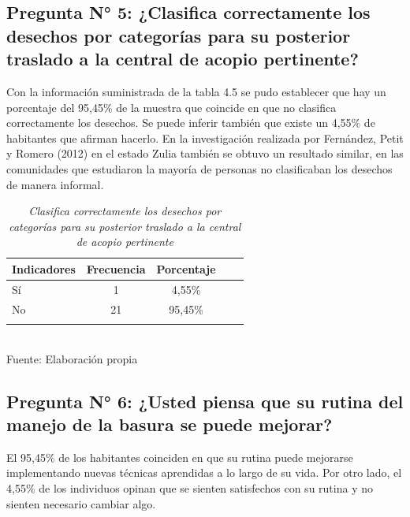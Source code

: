 {\setlength{\parskip}{0cm}
\subsection{Pregunta N° 5: ¿Clasifica correctamente los desechos por categorías para su posterior traslado a la central de acopio pertinente?}

Con la información suministrada de la tabla 4.5 se pudo establecer que hay un porcentaje del 95,45\% de la muestra que coincide en que no clasifica correctamente los desechos. Se puede inferir también que existe un 4,55\% de habitantes que afirman hacerlo. En la investigación realizada por Fernández, Petit y Romero (2012) en el estado Zulia también se obtuvo un resultado similar, en las comunidades que estudiaron la mayoría de personas no clasificaban los desechos de manera informal.

\newpage

\begin{table}[ht!]
    \centering
    \captionsetup{singlelinecheck=false, justification=raggedright, labelsep=newline}
    \caption{\textit{Clasifica correctamente los desechos por categorías para su posterior traslado a la central de acopio pertinente}}
    \begin{tabular}{lcccc}
        \toprule
        Indicadores & Frecuencia & Porcentaje\\
        \midrule
        Sí & 1 & 4,55\% \\
        No & 21 & 95,45\%\\
        \bottomrule
        \\
    \end{tabular}
    \\\RaggedRight Fuente: Elaboración propia
    \label{table:cuadro5}
\end{table}
}

{\setlength{\parskip}{0cm}
\subsection{Pregunta N° 6: ¿Usted piensa que su rutina del manejo de la basura se puede mejorar?}

El 95,45\% de los habitantes coinciden en que su rutina puede mejorarse implementando nuevas técnicas aprendidas a lo largo de su vida. Por otro lado, el 4,55\% de los individuos opinan que se sienten satisfechos con su rutina y no sienten necesario cambiar algo. 
}

